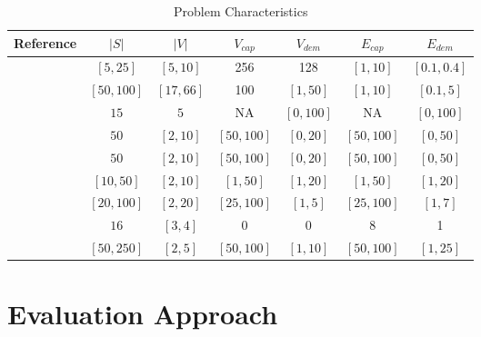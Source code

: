   \begin{table}[h]
  \begin{center}
    \small
    \caption{Problem Characteristics}\label{tab:band}
    \begin{tabular}{l c c c c c c}
    Reference             & $|S|$       & $|V|$     & $V_{cap}$  & $V_{dem}$ & $E_{cap}$   & $E_{dem}$      \\
    \hline
    \citet{Alkmim:2011}    & $[5,25] $   & $[5,10]$  & 256        & 128       & $[1,10]$    & $[0.1,0.4]$    \\
    \citet{Buriol:2012}    & $[50,100]$  & $[17,66]$ & 100        & $[1,50]$  & $[1,10]$    & $[0.1,5]$      \\
    \citet{Botero:2012}    & $15$        & $5$       & NA         & $[0,100]$ & NA          & $[0,100]$      \\ 
    \citet{Chowdhury2010}  & $50$        & $[2,10]$  & $[50,100]$ & $[0,20]$  & $[50,100]$   & $[0,50]$     \\
    \citet{Houidi:2011}    & $50$        & $[2,10]$  & $[50,100]$ & $[0,20]$  & $[50,100]$   & $[0,50]$     \\
    \citet{hu:2013}        & $[10,50]$   & $[2,10]$  & $[1,50]$   & $[1,20]$  & $[1,50]$     & $[1,20]$     \\
    \citet{infuhr:2011}    & $[20,100]$  & $[2,20]$  & $[25,100]$ & $[1,5]$ & $[25,100]$     & $[1,7]$        \\
    \citet{Pages:2012}     & $16$        & $[3,4]$   & 0          &  0        & 8           & 1              \\
    \citet{Guerzoni:2014}  & $[50,250]$  & $[2,5]$   & $[50,100]$ & $[1,10]$  & $[50,100]$  & $[1,25]$       \\
  \end{tabular}
\end{center}
\end{table}


\section{Evaluation Approach}
